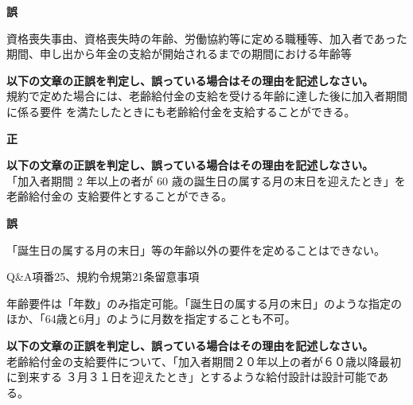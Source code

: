 \begin{answerbox}
  \textbf{誤}

  資格喪失事由、資格喪失時の年齢、労働協約等に定める職種等、加入者であった期間、申し出から年金の支給が開始されるまでの期間における年齢等
\end{answerbox}

\begin{truefalse}[年金1 H29 問題2(1)\textcircled{1}]
        \textbf{以下の文章の正誤を判定し、誤っている場合はその理由を記述しなさい。}
  \\

  規約で定めた場合には、老齢給付金の支給を受ける年齢に達した後に加入者期間に係る要件
を満たしたときにも老齢給付金を支給することができる。
\end{truefalse}

\begin{answerbox}
  \textbf{正}
\end{answerbox}

\begin{truefalse}[年金1 H28 問題2(1)\textcircled{4}]
\textbf{以下の文章の正誤を判定し、誤っている場合はその理由を記述しなさい。}
  \\

   「加入者期間 2 年以上の者が 60 歳の誕生日の属する月の末日を迎えたとき」を老齢給付金の
支給要件とすることができる。
\end{truefalse}

\begin{answerbox}
  \textbf{誤}

  「誕生日の属する月の末日」等の年齢以外の要件を定めることはできない。
\end{answerbox}

\begin{explanationbox}
  Q\&A項番25、規約令規第21条留意事項

  年齢要件は「年数」のみ指定可能。「誕生日の属する月の末日」のような指定のほか、「64歳と6月」のように月数を指定することも不可。
\end{explanationbox}

\begin{truefalse}[年金1 2025 問題1(3)エ\textcircled{1}]
\textbf{以下の文章の正誤を判定し、誤っている場合はその理由を記述しなさい。}
  \\

  老齢給付金の支給要件について、「加入者期間２０年以上の者が６０歳以降最初に到来する
３月３１日を迎えたとき」とするような給付設計は設計可能である。
\end{truefalse}

